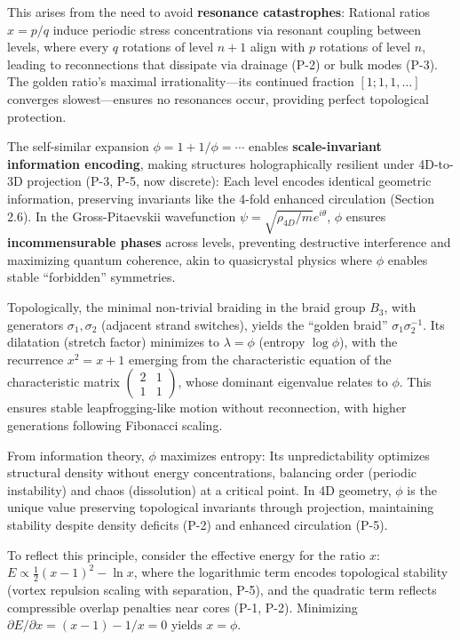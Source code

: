 This arises from the need to avoid \textbf{resonance catastrophes}: Rational ratios $x = p/q$ induce periodic stress concentrations via resonant coupling between levels, where every $q$ rotations of level $n+1$ align with $p$ rotations of level $n$, leading to reconnections that dissipate via drainage (P-2) or bulk modes (P-3). The golden ratio's maximal irrationality---its continued fraction $[1; 1, 1, \ldots]$ converges slowest---ensures no resonances occur, providing perfect topological protection.

The self-similar expansion $\phi = 1 + 1/\phi = \cdots$ enables \textbf{scale-invariant information encoding}, making structures holographically resilient under 4D-to-3D projection (P-3, P-5, now discrete): Each level encodes identical geometric information, preserving invariants like the 4-fold enhanced circulation (Section 2.6). In the Gross-Pitaevskii wavefunction $\psi = \sqrt{\rho_{4D}/m} e^{i \theta}$, $\phi$ ensures \textbf{incommensurable phases} across levels, preventing destructive interference and maximizing quantum coherence, akin to quasicrystal physics where $\phi$ enables stable ``forbidden'' symmetries.

Topologically, the minimal non-trivial braiding in the braid group $B_3$, with generators $\sigma_1, \sigma_2$ (adjacent strand switches), yields the ``golden braid'' $\sigma_1 \sigma_2^{-1}$. Its dilatation (stretch factor) minimizes to $\lambda = \phi$ (entropy $\log \phi$), with the recurrence $x^2 = x + 1$ emerging from the characteristic equation of the characteristic matrix $\begin{pmatrix} 2 & 1 \\ 1 & 1 \end{pmatrix}$, whose dominant eigenvalue relates to $\phi$. This ensures stable leapfrogging-like motion without reconnection, with higher generations following Fibonacci scaling.

From information theory, $\phi$ maximizes entropy: Its unpredictability optimizes structural density without energy concentrations, balancing order (periodic instability) and chaos (dissolution) at a critical point. In 4D geometry, $\phi$ is the unique value preserving topological invariants through projection, maintaining stability despite density deficits (P-2) and enhanced circulation (P-5).

To reflect this principle, consider the effective energy for the ratio $x$: $E \propto \frac{1}{2} (x - 1)^2 - \ln x$, where the logarithmic term encodes topological stability (vortex repulsion scaling with separation, P-5), and the quadratic term reflects compressible overlap penalties near cores (P-1, P-2). Minimizing $\partial E / \partial x = (x - 1) - 1/x = 0$ yields $x = \phi$.


